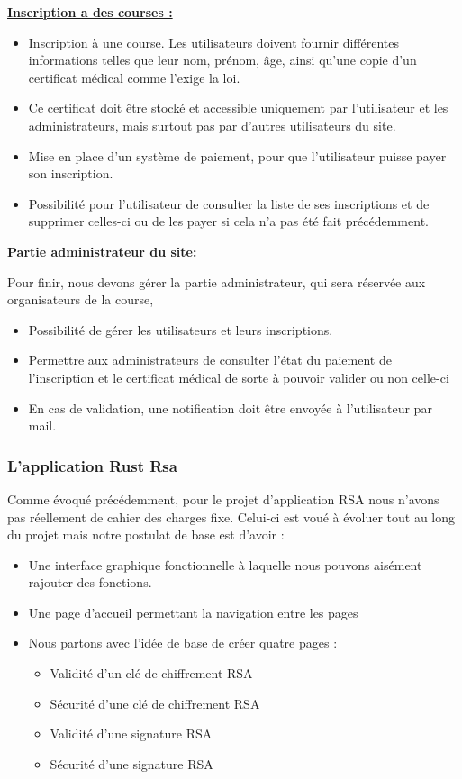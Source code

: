 \documentclass[12pt]{article} %
\begin{document}
\textbf{\underline{Inscription a des courses :}}
	\begin{itemize}
		\item Inscription à une course. Les utilisateurs doivent fournir différentes informations telles que leur nom, prénom, âge, ainsi qu’une copie d’un certificat médical comme l’exige la loi.  
		\item Ce certificat doit être stocké et accessible uniquement par l’utilisateur et les administrateurs, mais surtout pas par d’autres utilisateurs du site. 
		\item Mise en place d’un système de paiement, pour que l’utilisateur puisse payer son inscription. 
		\item Possibilité pour l’utilisateur de consulter la liste de ses inscriptions et de supprimer celles-ci ou de les payer si cela n’a pas été fait précédemment.

	\end{itemize}

\textbf{\underline{Partie administrateur du site:}}

	Pour finir, nous devons gérer la partie administrateur, qui sera réservée aux organisateurs de la course,
	\begin{itemize}
		\item Possibilité de gérer les utilisateurs et leurs inscriptions. 
		\item Permettre aux administrateurs de consulter l’état du paiement de l’inscription et le certificat médical de sorte à pouvoir valider ou non celle-ci
		\item En cas de validation, une notification doit être envoyée à l'utilisateur par mail.
	\end{itemize}
	
	\subsubsection{L’application Rust Rsa}
	Comme évoqué précédemment, pour le projet d’application RSA nous n’avons pas réellement de cahier des charges fixe. Celui-ci est voué à évoluer tout au long du projet mais notre postulat de base est d’avoir : 
	\begin{itemize}
		\item Une interface graphique fonctionnelle à laquelle nous pouvons aisément rajouter des fonctions.
		\item Une page d’accueil permettant la navigation entre les pages
		\item Nous partons avec l’idée de base de créer quatre pages :
		\begin{itemize}
			\item Validité d’un clé de chiffrement RSA
			\item Sécurité d’une clé de chiffrement RSA
			\item Validité d’une signature RSA
			\item Sécurité d’une signature RSA
		\end{itemize}
	\end{itemize}
	
\end{document}
